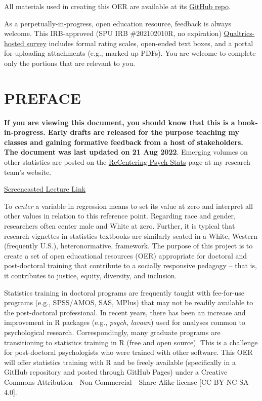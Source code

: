 \documentclass[
  11pt,
]{book}
\begin{document}
All materials used in creating this OER are available at its \href{https://github.com/lhbikos/ReCenterPsychStats}{GitHub repo}.

As a perpetually-in-progress, open education resource, feedback is always welcome. This IRB-approved (SPU IRB \#202102010R, no expiration) \href{https://spupsych.az1.qualtrics.com/jfe/form/SV_0OnBLfut3VIOIS2}{Qualtrics-hosted survey} includes formal rating scales, open-ended text boxes, and a portal for uploading attachments (e.g., marked up PDFs). You are welcome to complete only the portions that are relevant to you.

\hypertarget{preface}{%
\chapter*{PREFACE}\label{preface}}

\textbf{If you are viewing this document, you should know that this is a book-in-progress. Early drafts are released for the purpose teaching my classes and gaining formative feedback from a host of stakeholders. The document was last updated on 21 Aug 2022}. Emerging volumes on other statistics are posted on the \href{https://lhbikos.github.io/BikosRVT/ReCenter.html}{ReCentering Psych Stats} page at my research team's website.

\href{https://spu.hosted.panopto.com/Panopto/Pages/Viewer.aspx?id=c932455e-ef06-444a-bdca-acf7012d759a}{Screencasted Lecture Link}

To \emph{center} a variable in regression means to set its value at zero and interpret all other values in relation to this reference point. Regarding race and gender, researchers often center male and White at zero. Further, it is typical that research vignettes in statistics textbooks are similarly seated in a White, Western (frequently U.S.), heteronormative, framework. The purpose of this project is to create a set of open educational resources (OER) appropriate for doctoral and post-doctoral training that contribute to a socially responsive pedagogy -- that is, it contributes to justice, equity, diversity, and inclusion.

Statistics training in doctoral programs are frequently taught with fee-for-use programs (e.g., SPSS/AMOS, SAS, MPlus) that may not be readily available to the post-doctoral professional. In recent years, there has been an increase and improvement in R packages (e.g., \emph{psych}, \emph{lavaan}) used for analyses common to psychological research. Correspondingly, many graduate programs are transitioning to statistics training in R (free and open source). This is a challenge for post-doctoral psychologists who were trained with other software. This OER will offer statistics training with R and be freely available (specifically in a GitHub repository and posted through GitHub Pages) under a Creative Commons Attribution - Non Commercial - Share Alike license {[}CC BY-NC-SA 4.0{]}.
\end{document}
